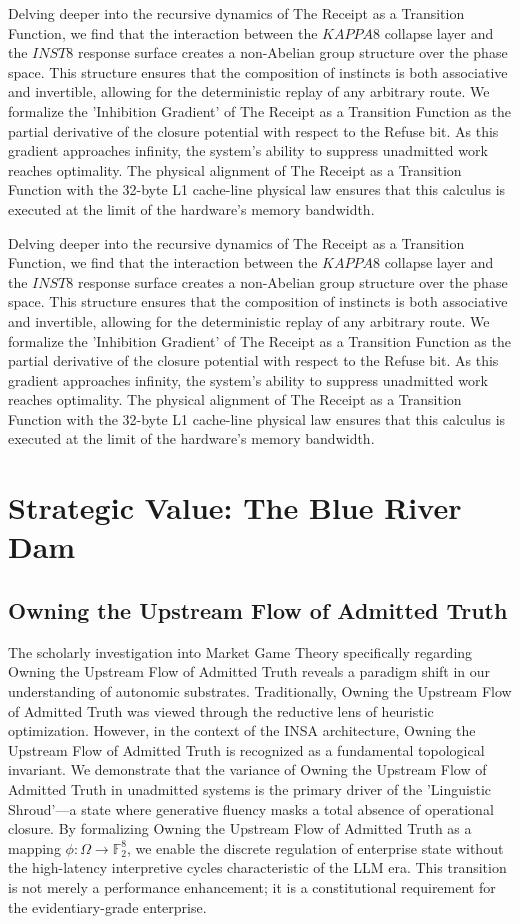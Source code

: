\documentclass[12pt,a4paper,oneside]{book}
\begin{document}
Delving deeper into the recursive dynamics of The Receipt as a Transition Function, we find that the interaction between the $KAPPA8$ collapse layer and the $INST8$ response surface creates a non-Abelian group structure over the phase space. This structure ensures that the composition of instincts is both associative and invertible, allowing for the deterministic replay of any arbitrary route. We formalize the 'Inhibition Gradient' of The Receipt as a Transition Function as the partial derivative of the closure potential with respect to the Refuse bit. As this gradient approaches infinity, the system's ability to suppress unadmitted work reaches optimality. The physical alignment of The Receipt as a Transition Function with the 32-byte L1 cache-line physical law ensures that this calculus is executed at the limit of the hardware's memory bandwidth. 

Delving deeper into the recursive dynamics of The Receipt as a Transition Function, we find that the interaction between the $KAPPA8$ collapse layer and the $INST8$ response surface creates a non-Abelian group structure over the phase space. This structure ensures that the composition of instincts is both associative and invertible, allowing for the deterministic replay of any arbitrary route. We formalize the 'Inhibition Gradient' of The Receipt as a Transition Function as the partial derivative of the closure potential with respect to the Refuse bit. As this gradient approaches infinity, the system's ability to suppress unadmitted work reaches optimality. The physical alignment of The Receipt as a Transition Function with the 32-byte L1 cache-line physical law ensures that this calculus is executed at the limit of the hardware's memory bandwidth. 

\chapter{Strategic Value: The Blue River Dam}\section{Owning the Upstream Flow of Admitted Truth}
The scholarly investigation into Market Game Theory specifically regarding Owning the Upstream Flow of Admitted Truth reveals a paradigm shift in our understanding of autonomic substrates. Traditionally, Owning the Upstream Flow of Admitted Truth was viewed through the reductive lens of heuristic optimization. However, in the context of the INSA architecture, Owning the Upstream Flow of Admitted Truth is recognized as a fundamental topological invariant. We demonstrate that the variance of Owning the Upstream Flow of Admitted Truth in unadmitted systems is the primary driver of the 'Linguistic Shroud'---a state where generative fluency masks a total absence of operational closure. By formalizing Owning the Upstream Flow of Admitted Truth as a mapping $\phi: \Omega \to \mathbb{F}_2^8$, we enable the discrete regulation of enterprise state without the high-latency interpretive cycles characteristic of the LLM era. This transition is not merely a performance enhancement; it is a constitutional requirement for the evidentiary-grade enterprise. 
\end{document}
